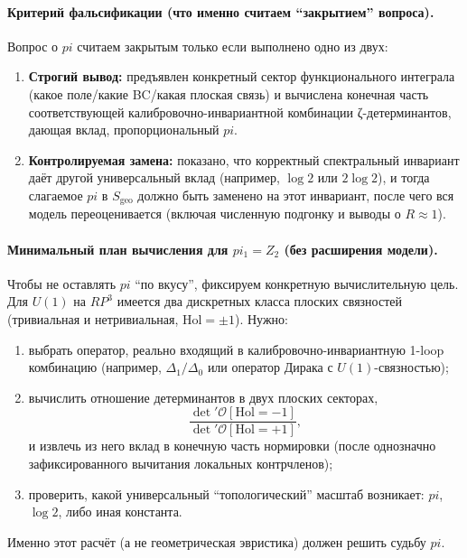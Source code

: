 \documentclass[12pt]{article}
\def\mathbb#1{#1}%
\def\pi{pi}%
\begin{document}
\paragraph{Критерий фальсификации (что именно считаем ``закрытием'' вопроса).}
Вопрос о $\pi$ считаем закрытым только если выполнено одно из двух:
\begin{enumerate}
  \item \textbf{Строгий вывод:} предъявлен конкретный сектор функционального интеграла (какое поле/какие BC/какая плоская связь) и вычислена конечная часть соответствующей калибровочно-инвариантной комбинации ζ-детерминантов, дающая вклад, пропорциональный $\pi$.

  \item \textbf{Контролируемая замена:} показано, что корректный спектральный инвариант даёт другой универсальный вклад (например, $\log 2$ или $2\log 2$), и тогда слагаемое $\pi$ в $S_{\mathrm{geo}}$ должно быть заменено на этот инвариант, после чего вся модель переоценивается (включая численную подгонку и выводы о $R\approx1$).
\end{enumerate}

\paragraph{Минимальный план вычисления для \texorpdfstring{$\pi_1=\mathbb{Z}_2$}{pi1=Z2} (без расширения модели).}
Чтобы не оставлять $\pi$ ``по вкусу'', фиксируем конкретную вычислительную цель.
Для $U(1)$ на $\mathbb{RP}^3$ имеется два дискретных класса плоских связностей (тривиальная и нетривиальная, $\mathrm{Hol}=\pm1$).
Нужно:
\begin{enumerate}
  \item выбрать оператор, реально входящий в калибровочно-инвариантную 1-loop комбинацию (например, $\Delta_1/\Delta_0$ или оператор Дирака с $U(1)$-связностью);
  \item вычислить отношение детерминантов в двух плоских секторах,
  \begin{equation}
  \frac{\det'\mathcal{O}[\mathrm{Hol}=-1]}{\det'\mathcal{O}[\mathrm{Hol}=+1]},
  \end{equation}
  и извлечь из него вклад в конечную часть нормировки (после однозначно зафиксированного вычитания локальных контрчленов);
  \item проверить, какой универсальный ``топологический'' масштаб возникает: $\pi$, $\log 2$, либо иная константа.
\end{enumerate}
Именно этот расчёт (а не геометрическая эвристика) должен решить судьбу $\pi$.
\end{document}
